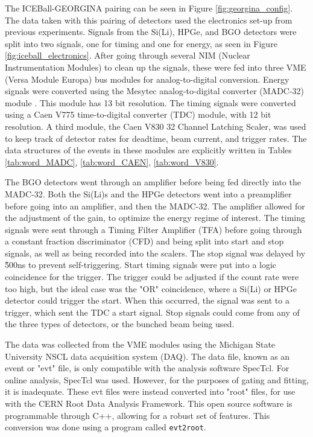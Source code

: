 The ICEBall-GEORGINA pairing can be seen in Figure \ref{fig:georgina_config}. The data taken with this pairing of detectors used the electronics set-up from previous experiments\citep{battaglia15:_iceball_176lu}. Signals from the Si(Li), HPGe, and BGO detectors were split into two signals, one for timing and one for energy, as seen in Figure \ref{fig:iceball_electronics}. After going through several NIM (Nuclear Instrumentation Modules) to clean up the signals, these were fed into three VME (Versa Module Europa) bus modules for analog-to-digital conversion. Energy signals were converted using the Mesytec analog-to-digital converter (MADC-32) module \citep{mesytec:_ADC}. This module has 13 bit resolution. The timing signals were converted using a Caen V775 time-to-digital converter (TDC) module, with 12 bit resolution\citep{caen:_TDC}. A third module, the Caen V830 32 Channel Latching Scaler, was used to keep track of detector rates for deadtime, beam current, and trigger rates\citep{caen:_scaler}. The data structures of the events in these modules are explicitly written in Tables \ref{tab:word_MADC}, \ref{tab:word_CAEN}, \ref{tab:word_V830}.



The BGO detectors went through an amplifier before being fed directly into the MADC-32. Both the Si(Li)s and the HPGe detectors went into a preamplifier before going into an amplifier, and then the MADC-32. The amplifier allowed for the adjustment of the gain, to optimize the energy regime of interest. The timing signals were sent through a Timing Filter Amplifier (TFA) before going through a constant fraction discriminator (CFD) and being split into start and stop signals, as well as being recorded into the scalers. The stop signal was delayed by \~500ns to prevent self-triggering. Start timing signals were put into a logic coincidence for the trigger. The trigger could be adjusted if the count rate were too high, but the ideal case was the "OR" coincidence, where a Si(Li) or HPGe detector could trigger the start. When this occurred, the signal was sent to a trigger, which sent the TDC a start signal. Stop signals could come from any of the three types of detectors, or the bunched beam being used.

The data was collected from the VME modules using the Michigan State University NSCL data acquisition system (DAQ)\citep{nscl:_daq}. The data file, known as an event or "evt" file, is only compatible with the analysis software SpecTcl\citep{nscl:_daq}. For online analysis, SpecTcl was used. However, for the purposes of gating and fitting, it is inadequate. These evt files were instead converted into "root" files, for use with the CERN Root Data Analysis Framework\citep{brun97:_root}. This open source software is programmable through C++, allowing for a robust set of features. This conversion was done using a program called \texttt{evt2root}\citep{smith14:_evt2root}.

